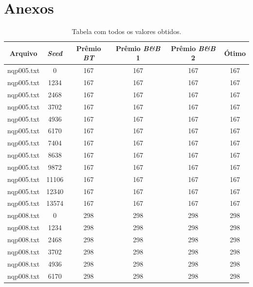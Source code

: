 \documentclass[12pt]{article}
\begin{document}





\newpage
\section{Anexos} \label{sec:anexo}

{ \scriptsize
	\begin{longtable}{c|c|cccc}
		\caption{Tabela com todos os valores obtidos.} \label{tab:resulAll} \\

		\hline
		Arquivo  & \textit{Seed} & Prêmio \textit{BT} & Prêmio \textit{B\&B} 1 & Prêmio \textit{B\&B} 2 & Ótimo \\ \hline
		nqp005.txt    &   0       &   167    &   167    &   167    & 167        \\
		nqp005.txt    &   1234    &   167    &   167    &   167    & 167        \\
		nqp005.txt    &   2468    &   167    &   167    &   167    & 167        \\
		nqp005.txt    &   3702    &   167    &   167    &   167    & 167        \\
		nqp005.txt    &   4936    &   167    &   167    &   167    & 167        \\
		nqp005.txt    &   6170    &   167    &   167    &   167    & 167        \\
		nqp005.txt    &   7404    &   167    &   167    &   167    & 167        \\
		nqp005.txt    &   8638    &   167    &   167    &   167    & 167        \\
		nqp005.txt    &   9872    &   167    &   167    &   167    & 167        \\
		nqp005.txt    &   11106   &   167    &   167    &   167    & 167        \\
		nqp005.txt    &   12340   &   167    &   167    &   167    & 167        \\
		nqp005.txt    &   13574   &   167    &   167    &   167    & 167        \\ \hline
		nqp008.txt    &   0       &   298    &   298    &   298    & 298        \\
		nqp008.txt    &   1234    &   298    &   298    &   298    & 298        \\
		nqp008.txt    &   2468    &   298    &   298    &   298    & 298        \\
		nqp008.txt    &   3702    &   298    &   298    &   298    & 298        \\
		nqp008.txt    &   4936    &   298    &   298    &   298    & 298        \\
		nqp008.txt    &   6170    &   298    &   298    &   298    & 298        \\


\end{longtable}}
\end{document}
